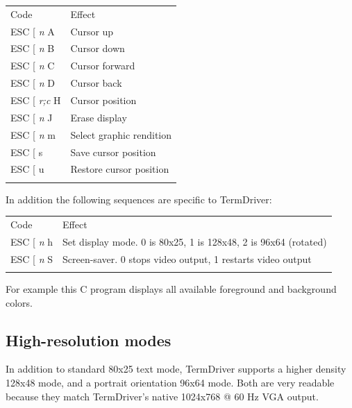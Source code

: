 \documentclass{article}
\newcommand{\heavyline}{\specialrule{1pt}{1pt}{1pt}}
\newcommand{\gap}{\vspace{10pt}}
\begin{document}
\gap\noindent
\begin{tabularx}{\linewidth}{lX}
\heavyline
Code & Effect \\ \heavyline

ESC {[} \emph{n} A & Cursor up \\

ESC {[} \emph{n} B & Cursor down \\

ESC {[} \emph{n} C & Cursor forward \\

ESC {[} \emph{n} D & Cursor back \\

ESC {[} \emph{r;c} H & Cursor position \\

ESC {[} \emph{n} J & Erase display \\

ESC {[} \emph{n} m & Select graphic rendition \\

ESC {[} s & Save cursor position \\

ESC {[} u & Restore cursor position \\ \heavyline
\end{tabularx}
\gap

In addition the following sequences are specific to TermDriver:

\gap
\noindent
\begin{tabularx}{\linewidth}{lX}
\heavyline
Code & Effect \\ \heavyline

ESC {[} \emph{n} h & 
Set display mode.  0 is 80x25, 1 is 128x48, 2 is 96x64 (rotated)
\\

ESC {[} \emph{n} S & Screen-saver.  0 stops video output, 1 restarts video output
\\ \heavyline
\end{tabularx}
\gap

\noindent
For example this C program displays all available foreground and background colors.


\subsection{High-resolution modes}

In addition to standard 80x25 text mode,
TermDriver supports a higher density 128x48 mode,
and a portrait orientation 96x64 mode.
Both are very readable because
they match TermDriver's native 1024x768 @ 60 Hz VGA output.
\end{document}
